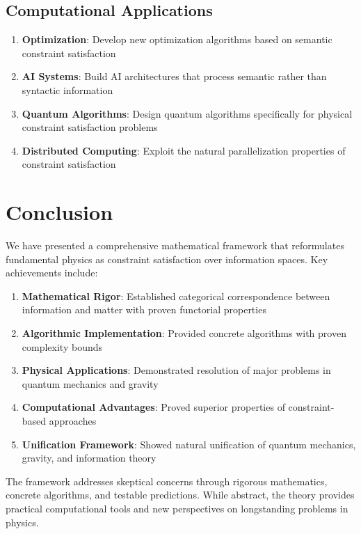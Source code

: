 \documentclass[11pt]{article}
\theoremstyle{definition}
\begin{document}
\subsection{Computational Applications}

\begin{enumerate}
\item \textbf{Optimization}: Develop new optimization algorithms based on semantic constraint satisfaction
\item \textbf{AI Systems}: Build AI architectures that process semantic rather than syntactic information
\item \textbf{Quantum Algorithms}: Design quantum algorithms specifically for physical constraint satisfaction problems
\item \textbf{Distributed Computing}: Exploit the natural parallelization properties of constraint satisfaction
\end{enumerate}

\section{Conclusion}

We have presented a comprehensive mathematical framework that reformulates fundamental physics as constraint satisfaction over information spaces. Key achievements include:

\begin{enumerate}
\item \textbf{Mathematical Rigor}: Established categorical correspondence between information and matter with proven functorial properties
\item \textbf{Algorithmic Implementation}: Provided concrete algorithms with proven complexity bounds
\item \textbf{Physical Applications}: Demonstrated resolution of major problems in quantum mechanics and gravity
\item \textbf{Computational Advantages}: Proved superior properties of constraint-based approaches
\item \textbf{Unification Framework}: Showed natural unification of quantum mechanics, gravity, and information theory
\end{enumerate}

The framework addresses skeptical concerns through rigorous mathematics, concrete algorithms, and testable predictions. While abstract, the theory provides practical computational tools and new perspectives on longstanding problems in physics.
\end{document}
